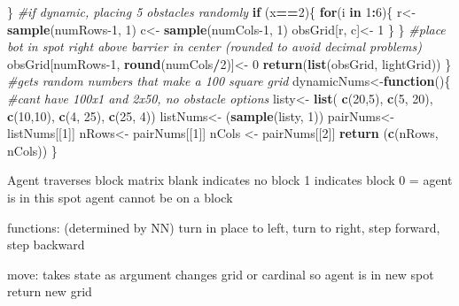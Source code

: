 \documentclass[]{article}
\newenvironment{Shaded}{\begin{snugshade}}{\end{snugshade}}
\newcommand{\CommentTok}[1]{\textcolor[rgb]{0.56,0.35,0.01}{\textit{#1}}}
\newcommand{\ControlFlowTok}[1]{\textcolor[rgb]{0.13,0.29,0.53}{\textbf{#1}}}
\newcommand{\DecValTok}[1]{\textcolor[rgb]{0.00,0.00,0.81}{#1}}
\newcommand{\KeywordTok}[1]{\textcolor[rgb]{0.13,0.29,0.53}{\textbf{#1}}}
\newcommand{\NormalTok}[1]{#1}
\newcommand{\OperatorTok}[1]{\textcolor[rgb]{0.81,0.36,0.00}{\textbf{#1}}}
\newcommand{\StringTok}[1]{\textcolor[rgb]{0.31,0.60,0.02}{#1}}
\begin{document}
\begin{Shaded}
\begin{Highlighting}[]
\NormalTok{  \} }
  \CommentTok{#if dynamic, placing 5 obstacles randomly}
  \ControlFlowTok{if}\NormalTok{ (x}\OperatorTok{==}\DecValTok{2}\NormalTok{)\{}
    \ControlFlowTok{for}\NormalTok{(i }\ControlFlowTok{in} \DecValTok{1}\OperatorTok{:}\DecValTok{6}\NormalTok{)\{}
\NormalTok{    r<-}\StringTok{ }\KeywordTok{sample}\NormalTok{(numRows}\DecValTok{-1}\NormalTok{, }\DecValTok{1}\NormalTok{)}
\NormalTok{    c<-}\StringTok{ }\KeywordTok{sample}\NormalTok{(numCols}\DecValTok{-1}\NormalTok{, }\DecValTok{1}\NormalTok{)}
\NormalTok{    obsGrid[r, c]<-}\StringTok{ }\DecValTok{1}
\NormalTok{    \}}
\NormalTok{  \}}
  \CommentTok{#place bot in spot right above barrier in center (rounded to avoid decimal problems)}
\NormalTok{    obsGrid[numRows}\DecValTok{-1}\NormalTok{, }\KeywordTok{round}\NormalTok{(numCols}\OperatorTok{/}\DecValTok{2}\NormalTok{)]<-}\StringTok{ }\DecValTok{0}
    \KeywordTok{return}\NormalTok{(}\KeywordTok{list}\NormalTok{(obsGrid, lightGrid))}
\NormalTok{\}}
\CommentTok{#gets random numbers that make a 100 square grid}
\NormalTok{dynamicNums<-}\ControlFlowTok{function}\NormalTok{()\{}
  \CommentTok{#cant have 100x1 and 2x50, no obstacle options}
\NormalTok{  listy<-}\StringTok{ }\KeywordTok{list}\NormalTok{( }\KeywordTok{c}\NormalTok{(}\DecValTok{20}\NormalTok{,}\DecValTok{5}\NormalTok{), }\KeywordTok{c}\NormalTok{(}\DecValTok{5}\NormalTok{, }\DecValTok{20}\NormalTok{), }\KeywordTok{c}\NormalTok{(}\DecValTok{10}\NormalTok{,}\DecValTok{10}\NormalTok{), }\KeywordTok{c}\NormalTok{(}\DecValTok{4}\NormalTok{, }\DecValTok{25}\NormalTok{), }\KeywordTok{c}\NormalTok{(}\DecValTok{25}\NormalTok{, }\DecValTok{4}\NormalTok{))}
\NormalTok{  listNums<-}\StringTok{ }\NormalTok{(}\KeywordTok{sample}\NormalTok{(listy, }\DecValTok{1}\NormalTok{))}
\NormalTok{  pairNums<-}\StringTok{ }\NormalTok{listNums[[}\DecValTok{1}\NormalTok{]]}
\NormalTok{  nRows<-}\StringTok{ }\NormalTok{pairNums[[}\DecValTok{1}\NormalTok{]]}
\NormalTok{  nCols <-}\StringTok{ }\NormalTok{pairNums[[}\DecValTok{2}\NormalTok{]]}
  \KeywordTok{return}\NormalTok{ (}\KeywordTok{c}\NormalTok{(nRows, nCols))}
\NormalTok{\}}
\end{Highlighting}
\end{Shaded}

Agent traverses block matrix blank indicates no block 1 indicates block
0 = agent is in this spot agent cannot be on a block

functions: (determined by NN) turn in place to left, turn to right, step
forward, step backward

move: takes state as argument changes grid or cardinal so agent is in
new spot return new grid
\end{document}
